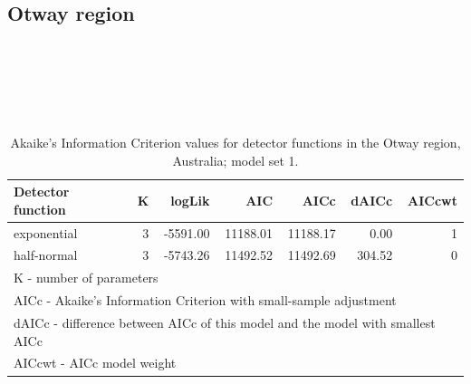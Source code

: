 \documentclass[11pt,a4paper,titlepage,twoside,openright]{style/unimelbthesis}
\begin{document}
\begin{mainmatter}
\newpage

\hypertarget{otway-region-2}{%
\subsection{Otway region}\label{otway-region-2}}

\(~\)

\(~\)

\(~\)

\begingroup\fontsize{10}{12}\selectfont
\begin{longtable}[t]{lrrrrrr}
\caption{\label{tab:density-aic-o-1}Akaike's Information Criterion values for detector functions in the Otway region, Australia; model set 1.}\\
\toprule
Detector function & K & logLik & AIC & AICc & dAICc & AICcwt\\
\midrule
exponential & 3 & -5591.00 & 11188.01 & 11188.17 & 0.00 & 1\\
half-normal & 3 & -5743.26 & 11492.52 & 11492.69 & 304.52 & 0\\
\bottomrule
\multicolumn{7}{l}{\rule{0pt}{1em}K - number of parameters}\\
\multicolumn{7}{l}{\rule{0pt}{1em}AICc - Akaike's Information Criterion with small-sample adjustment}\\
\multicolumn{7}{l}{\rule{0pt}{1em}dAICc - difference between AICc of this model and the model with smallest AICc}\\
\multicolumn{7}{l}{\rule{0pt}{1em}AICcwt - AICc model weight}\\
\end{longtable}
\endgroup{}

\newpage

\(~\)

\(~\)

\(~\)


\end{mainmatter}
\end{document}
